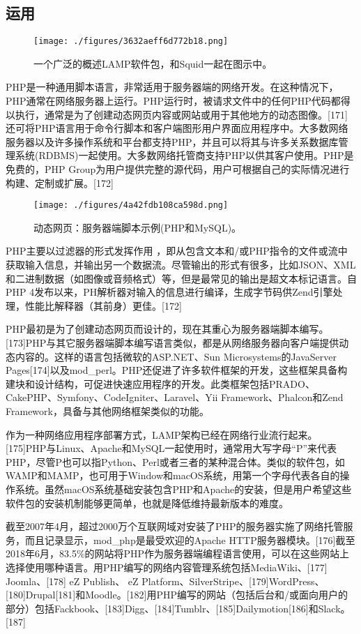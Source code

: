 \subsection{运用}
\begin{figure}[ht]
\centering
\texttt{[image: ./figures/3632aeff6d772b18.png]}
\caption{一个广泛的概述LAMP软件包，和Squid一起在图示中。} \label{fig_PHP_6}
\end{figure}
PHP是一种通用脚本语言，非常适用于服务器端的网络开发。在这种情况下，PHP通常在网络服务器上运行。PHP运行时，被请求文件中的任何PHP代码都得以执行，通常是为了创建动态网页内容或网站或用于其他地方的动态图像。[171] 还可将PHP语言用于命令行脚本和客户端图形用户界面应用程序中。大多数网络服务器以及许多操作系统和平台都支持PHP，并且可以将其与许多关系数据库管理系统(RDBMS)一起使用。大多数网络托管商支持PHP以供其客户使用。PHP是免费的，PHP Group为用户提供完整的源代码，用户可根据自己的实际情况进行构建、定制或扩展。[172]
\begin{figure}[ht]
\centering
\texttt{[image: ./figures/4a42fdb108ca598d.png]}
\caption{动态网页：服务器端脚本示例(PHP和MySQL)。} \label{fig_PHP_7}
\end{figure}
PHP主要以过滤器的形式发挥作用 ，即从包含文本和/或PHP指令的文件或流中获取输入信息，并输出另一个数据流。尽管输出的形式有很多，比如JSON、XML和二进制数据（如图像或音频格式）等，但是最常见的输出是超文本标记语言。自PHP 4发布以来，PH解析器对输入的信息进行编译，生成字节码供Zend引擎处理，性能比解释器（其前身）更佳。[172]

PHP最初是为了创建动态网页而设计的，现在其重心为服务器端脚本编写。[173]PHP与其它服务器端脚本编写语言类似，都是从网络服务器向客户端提供动态内容的。这样的语言包括微软的ASP.NET、Sun Microsystems的JavaServer Pages[174]以及mod_perl。PHP还促进了许多软件框架的开发，这些框架具备构建块和设计结构，可促进快速应用程序的开发。此类框架包括PRADO、CakePHP、Symfony、CodeIgniter、Laravel、Yii Framework、Phalcon和Zend Framework，具备与其他网络框架类似的功能。

作为一种网络应用程序部署方式，LAMP架构已经在网络行业流行起来。[175]PHP与Linux、Apache和MySQL一起使用时，通常用大写字母“P”来代表PHP，尽管P也可以指Python、Perl或者三者的某种混合体。类似的软件包，如WAMP和MAMP，也可用于Window和macOS系统，用第一个字母代表各自的操作系统。虽然macOS系统基础安装包含PHP和Apache的安装，但是用户希望这些软件包的安装机制能够更简单，也就是降低维持最新版本的难度。

截至2007年4月，超过2000万个互联网域对安装了PHP的服务器实施了网络托管服务，而且记录显示，mod_php是最受欢迎的Apache HTTP服务器模块。[176]截至2018年6月，83.5\%的网站将PHP作为服务器端编程语言使用，可以在这些网站上选择使用哪种语言。用PHP编写的网络内容管理系统包括MediaWiki、[177] Joomla、[178] eZ Publish、 eZ Platform、SilverStripe、[179]WordPress、[180]Drupal[181]和Moodle。[182]用PHP编写的网站（包括后台和/或面向用户的部分）包括Fackbook、[183]Digg、[184]Tumblr、[185]Dailymotion[186]和Slack。[187]

